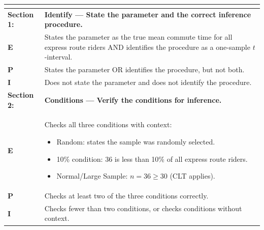 \documentclass[12pt]{article}
\begin{document}
\renewcommand{\arraystretch}{1.6}
\begin{tabular}{|>{\bfseries}p{3cm}|p{11cm}|}
\hline
\multicolumn{2}{|c|}{\textbf{Part (a): Confidence Interval Construction}} \\
\hline
\hline
Section 1: & \textbf{Identify --- State the parameter and the correct inference procedure.} \\
\hline
E & States the parameter as the true mean commute time for all express route riders AND identifies the procedure as a one-sample $t$-interval. \\
\hline
P & States the parameter OR identifies the procedure, but not both. \\
\hline
I & Does not state the parameter and does not identify the procedure. \\
\hline
\hline
Section 2: & \textbf{Conditions --- Verify the conditions for inference.} \\
\hline
E & Checks all three conditions with context:
\begin{itemize}[nosep, topsep=0pt]
    \item Random: states the sample was randomly selected.
    \item 10\% condition: 36 is less than 10\% of all express route riders.
    \item Normal/Large Sample: $n = 36 \geq 30$ (CLT applies).
\end{itemize} \\
\hline
P & Checks at least two of the three conditions correctly. \\
\hline
I & Checks fewer than two conditions, or checks conditions without context. \\
\hline
\end{tabular}

\vspace{0.3cm}
\end{document}
